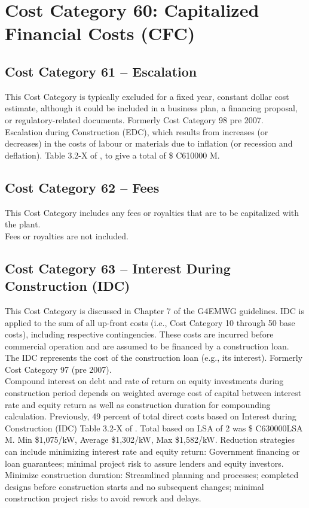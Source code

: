 \section{Cost Category 60: Capitalized Financial Costs (CFC)}

\subsection*{Cost Category 61 – Escalation}
This Cost Category is typically excluded for a fixed year, constant dollar cost estimate, although it could be included in a business plan, a financing proposal, or regulatory-related documents.  Formerly Cost Category 98 pre 2007.\\

Escalation during Construction (EDC), which results from increases (or decreases) in the costs of labour 
or materials due to inflation (or recession and deflation). Table 3.2-X of \cite{SCH78}, to give a total of \$ C610000 M.

\subsection*{Cost Category 62 – Fees}
This Cost Category includes any fees or royalties that are to be capitalized with the plant.\\

Fees or royalties are not included.

\subsection*{Cost Category 63 – Interest During Construction (IDC)}
This Cost Category is discussed in Chapter 7 of the G4EMWG guidelines. IDC is applied to the sum of all up-front costs (i.e., Cost Category 10 through 50 base costs), including respective contingencies. These costs are incurred before commercial operation and are assumed to be financed by a construction loan. The IDC represents the cost of the construction loan (e.g., its interest). Formerly Cost Category 97 (pre 2007).\\

Compound interest on debt and rate of return on equity investments during construction 
period depends on weighted average cost of capital between interest rate and equity  return as well as construction duration for compounding calculation. Previously,  49 percent of total direct costs based on Interest during Construction (IDC) Table 3.2-X of \cite{SCH78}.  Total based on LSA of 2 was \$ C630000LSA M. Min \$1,075/kW, Average \$1,302/kW, Max \$1,582/kW. Reduction strategies can include minimizing interest rate and equity return: Government financing or loan guarantees; minimal project risk to assure lenders and equity investors. Minimize construction duration:  Streamlined planning and processes; completed designs before construction starts and no subsequent  changes; minimal construction project risks to avoid rework and delays.\\

